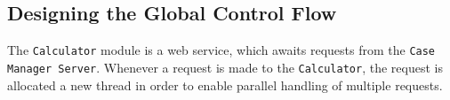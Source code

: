 \subsection{Designing the Global Control Flow}
The \texttt{Calculator} module is a web service, which awaits requests from the \texttt{Case Manager Server}. Whenever a request is made to the \texttt{Calculator}, the request is allocated a new thread in order to enable parallel handling of multiple requests.